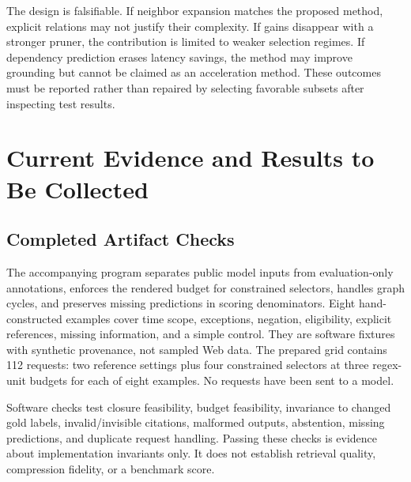 \documentclass[10pt,twocolumn]{article}
\begin{document}
The design is falsifiable. If neighbor expansion matches the proposed method, explicit relations may not justify their complexity. If gains disappear with a stronger pruner, the contribution is limited to weaker selection regimes. If dependency prediction erases latency savings, the method may improve grounding but cannot be claimed as an acceleration method. These outcomes must be reported rather than repaired by selecting favorable subsets after inspecting test results.

\section{Current Evidence and Results to Be Collected}
\subsection{Completed Artifact Checks}
The accompanying program separates public model inputs from evaluation-only annotations, enforces the rendered budget for constrained selectors, handles graph cycles, and preserves missing predictions in scoring denominators. Eight hand-constructed examples cover time scope, exceptions, negation, eligibility, explicit references, missing information, and a simple control. They are software fixtures with synthetic provenance, not sampled Web data. The prepared grid contains 112 requests: two reference settings plus four constrained selectors at three regex-unit budgets for each of eight examples. No requests have been sent to a model.

Software checks test closure feasibility, budget feasibility, invariance to changed gold labels, invalid/invisible citations, malformed outputs, abstention, missing predictions, and duplicate request handling. Passing these checks is evidence about implementation invariants only. It does not establish retrieval quality, compression fidelity, or a benchmark score.
\end{document}
